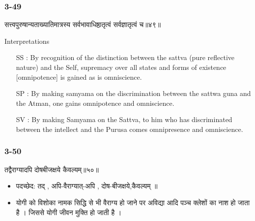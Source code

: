 \begin{frame}[fragile]\frametitle{3-49}
\begin{sanskrit}
सत्त्वपुरुषान्यताख्यातिमात्रस्य सर्वभावाधिष्ठातृत्वं सर्वज्ञातृत्वं च॥४९॥
\end{sanskrit}

Interpretations
\begin{itemize}	
\item [SS]: By recognition of the distinction between the sattva (pure reflective nature) and the Self, supremacy over all states and forms of existence [omnipotence] is gained as is omniscience.
\item [SP]: By making samyama on the discrimination between the sattwa guna and the Atman, one gains omnipotence and omniscience.
\item [SV]: By making Samyama on the Sattva, to him who has discriminated between the intellect and the Purusa comes omnipresence and omniscience. 
\end{itemize}
\end{frame}

\begin{frame}[fragile]\frametitle{3-50}
\begin{sanskrit}
तद्वैराग्यादपि दोषबीजक्षये कैवल्यम्॥५०॥
\end{sanskrit}

\begin{itemize}
\item पदच्छेद:  तद् , अपि-वैराग्यात्-अपि , दोष-बीजक्षये,कैवल्यम् ॥
\item योगी को विशोका नामक सिद्धि से भी वैराग्य हो जाने पर अविद्या आदि पञ्च क्लेशों का नाश हो जाता है । जिससे योगी जीवन मुक्ति हो जाती है ।
\end{itemize}
\end{frame}

